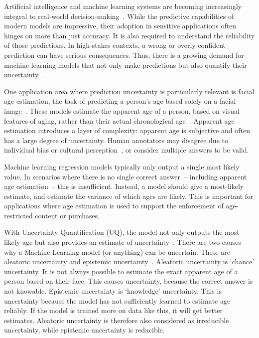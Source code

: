 \documentclass[runningheads]{llncs}
\begin{document}
Artificial intelligence and machine learning systems are becoming increasingly integral to real-world decision-making~\cite{mckinsey2024}. While the predictive capabilities of modern models are impressive, their adoption in sensitive applications often hinges on more than just accuracy. It is also required to understand the reliability of those predictions. In high-stakes contexts, a wrong or overly confident prediction can have serious consequences. Thus, there is a growing demand for machine learning models that not only make predictions but also quantify their uncertainty~\cite{lakshminarayanan2017simple,gawlikowski2021survey,ribeiro2016should}.

One application area where prediction uncertainty is particularly relevant is facial age estimation, the task of predicting a person's age based solely on a facial image~\cite{fu2010age}. These models estimate the apparent age of a person, based on visual features of aging, rather than their actual chronological age~\cite{escalera2015chalearn}. Apparent age estimation introduces a layer of complexity: apparent age is subjective and often has a large degree of uncertainty. Human annotators may disagree due to individual bias or cultural perception~\cite{agustsson2017wild,escalera2017chalearn}, or consider multiple answers to be valid.

Machine learning regression models typically only output a single most likely value. In scenarios where there is no single correct answer~-- including apparent age estimation~-- this is insufficient. Instead, a model should give a most-likely estimate, and estimate the variance of which ages are likely. This is important for applications where age estimation is used to support the enforcement of age-restricted content or purchases.

With Uncertainty Quantification (UQ), the model not only outputs the most likely age but also provides an estimate of uncertainty~\cite{he2023survey}. There are two causes why a Machine Learning model (or anything) can be uncertain. These are aleatoric uncertainty and epistemic uncertainty~\cite{hullermeier2021aleatoric}. Aleatoric uncertainty is `chance' uncertainty. It is not always possible to estimate the exact apparent age of a person based on their face. This causes uncertainty, because the correct answer is not knowable. Epistemic uncertainty is `knowledge' uncertainty. This is uncertainty because the model has not sufficiently learned to estimate age reliably. If the model is trained more on data like this, it will get better estimates. Aleatoric uncertainty is therefore also considered as irreducible uncertainty, while epistemic uncertainty is reducible.
\end{document}
